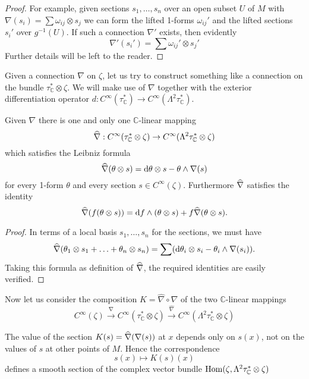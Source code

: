 \documentclass[../main]{subfiles}
\begin{document}
\begin{proof}
For example, given sections $s_{1}, \ldots, s_{n}$ over an open subset $U$ of $M$ with $\nabla(s_{i})=\sum \omega_{i j} \otimes s_{j}$ we can form the lifted 1-forms $\omega_{i j} '$ and the lifted sections $s_{i} '$ over $g^{-1}(U)$. If such a connection $\nabla '$ exists, then evidently
\[
\nabla' (s_{i}')=\sum \omega_{i j}' \otimes s_{j} '
\]
Further details will be left to the reader.

\end{proof}

Given a connection $\nabla$ on $\zeta$, let us try to construct something like a connection on the bundle $\tau_{\mathbb{C}}^{*} \otimes \zeta$. We will make use of $\nabla$ together with the exterior differentiation operator $d: C^\infty (\tau_{\mathbb{C}}^{*}) \rightarrow C^\infty (\Lambda^{2} \tau_{\mathbb{C}}^{*})$.

\begin{lemma}
Given $\nabla$ there is one and only one $\mathbb{C}$-linear mapping
\[\xhat{\nabla}: C^\infty (\tau_{\mathbb{C}}^{*} \otimes \zeta) \rightarrow C^\infty (\Lambda^{2} \tau_{\mathbb{C}}^{*} \otimes \zeta)
\]
which satisfies the Leibniz formula
\[
\xhat{\nabla}(\theta \otimes s)= \dd\theta \otimes s-\theta \wedge \nabla(s)
\]
for every 1-form $\theta$ and every section $s \in C^\infty (\zeta)$. Furthermore $\xhat{\nabla}$ satisfies the identity \[\xhat{\nabla}(f(\theta \otimes s))=\dd f \wedge(\theta \otimes s)+f \xhat{\nabla}(\theta \otimes s).\]
\end{lemma}

\begin{proof}
In terms of a local basis $s_{1}, \ldots, s_{n}$ for the sections, we must have
\[
\xhat{\nabla}(\theta_{1} \otimes s_{1}+\ldots+\theta_{n} \otimes s_{n})=\sum(\dd \theta_{i} \otimes s_{i}-\theta_{i} \wedge \nabla(s_{i})).
\]
Taking this formula as definition of $\xhat{\nabla}$, the required identities are easily verified.
\end{proof}

Now let us consider the composition $K=\widehat{\nabla} \circ \nabla$ of the two $\mathbb{C}$-linear mappings
\[
C^\infty (\zeta) \stackrel{\nabla}{\longrightarrow} C^\infty (\tau_{\mathbb{C}}^{*} \otimes \zeta) \stackrel{\widehat{\nabla}}{\longrightarrow} C^\infty (\Lambda^{2} \tau_{\mathbb{C}}^{*} \otimes \zeta)
\]

\begin{lemma}
The value of the section $K(s)=\xhat{\nabla}(\nabla(s))$ at $x$ depends only on $s(x)$, not on the values of $s$ at other points of $M$. Hence the correspondence
\[
s(x) \mapsto K(s)(x)
\]
defines a smooth section of the complex vector bundle $\operatorname{Hom}(\zeta, \Lambda^{2} \tau_{\mathbb{C}}^{*} \otimes \zeta)$
\end{lemma}
\end{document}
